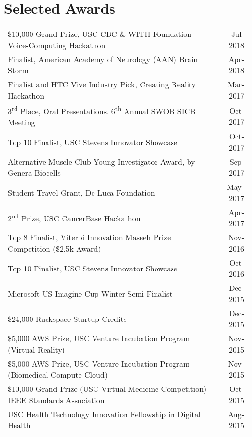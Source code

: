 \documentclass[10pt,a4paper]{article}
\newcommand{\ts}{\textsuperscript}
\begin{document}
  \vspace*{2mm}\section*{Selected Awards}
  
  \vspace*{1mm}\noindent\begin{tabularx}{17cm}{X r}
  	\$10,000 Grand Prize, USC CBC \& WITH Foundation Voice-Computing Hackathon & Jul-2018\\ %
	Finalist, American Academy of Neurology (AAN) Brain Storm & Apr-2018 \\%
	Finalist and HTC Vive Industry Pick, Creating Reality Hackathon & Mar-2017 \\%
    3\ts{rd} Place, Oral Presentations. 6\ts{th} Annual SWOB SICB Meeting & Oct-2017\\ %
    Top 10 Finalist, USC Stevens Innovator Showcase & Oct-2017 \\%
    Alternative Muscle Club Young Investigator Award, by Genera Biocells & Sep-2017\\
    Student Travel Grant, De Luca Foundation & May-2017\\ %
    2\ts{nd} Prize, USC CancerBase Hackathon & Apr-2017 \\ %
    Top 8 Finalist, Viterbi Innovation Maseeh Prize Competition (\$2.5k Award) & Nov-2016 \\ %
    Top 10 Finalist, USC Stevens Innovator Showcase & Oct-2016 \\ %
    Microsoft US Imagine Cup Winter Semi-Finalist & Dec-2015 \\
    \$24,000 Rackspace Startup Credits & Dec-2015\\
    \$5,000 AWS Prize, USC Venture Incubation Program (Virtual Reality) & Nov-2015\\
    \$5,000 AWS Prize, USC Venture Incubation Program (Biomedical Compute Cloud) & Nov-2015\\
    \$10,000 Grand Prize (USC Virtual Medicine Competition) IEEE Standards Association  & Oct-2015\\ %
    USC Health Technology Innovation Fellowship in Digital Health & Aug-2015\\ 


\end{tabularx}
\end{document}
